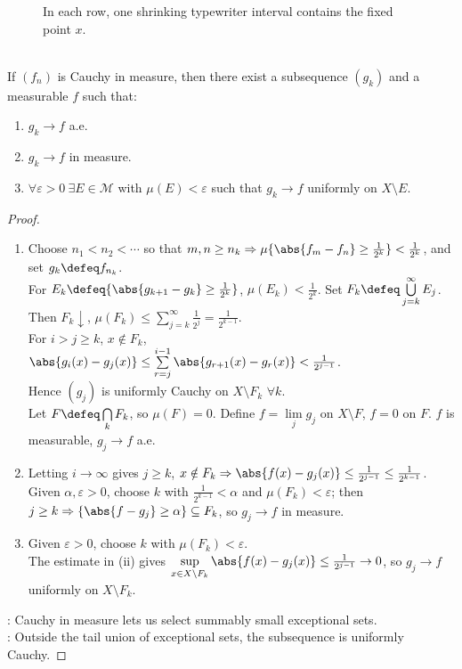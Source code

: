 \begin{figure}[H]
  \centering
  
  \caption{In each row, one shrinking typewriter interval contains the fixed point \textcolor{red!70!black}{$x$}.}
  \label{fig:typewriter-intervals-lp-no-pointwise}
\end{figure}

\begin{theorem} \label{thm:riesz-subsequence-cauchy-measure} \\
If $(f_n)$ is Cauchy in measure, then there exist a subsequence $(g_k)$ and a measurable $f$ such that:
\begin{enumerate}[label=(\roman*)]
\setlength{\itemsep}{0pt}
\item $g_k\to f$ a.e.
\item $g_k\to f$ in measure.
\item $\forall\varepsilon>0\ \exists E\in\mathcal{M}$ with $\mu(E)<\varepsilon$ such that $g_k\to f$ uniformly on $X\setminus E$.
\end{enumerate}
\begin{proof}
\begin{enumerate}[label=(\roman*)]
\setlength{\itemsep}{0pt}
\item Choose $n_1<n_2<\cdots$ so that $m,n\geq n_k\Rightarrow\mu\{\abs{f_m-f_n}\geq\frac{1}{2^k}\}<\frac{1}{2^k}$, and set $g_k\defeq f_{n_k}$.\\
For $E_k\defeq\{\abs{g_{k+1}-g_k}\geq\frac{1}{2^k}\}$, $\mu(E_k)<\frac{1}{2^k}$. Set $F_k\defeq\bigcup\limits_{j=k}^{\infty}E_j$. Then $F_k\downarrow$, $\mu(F_k)\leq\sum\limits_{j=k}^{\infty}\frac{1}{2^j}=\frac{1}{2^{k-1}}$.\\
For $i>j\geq k$, $x\notin F_k$, $\abs{g_i(x)-g_j(x)}\leq\sum\limits_{r=j}^{i-1}\abs{g_{r+1}(x)-g_r(x)}<\frac{1}{2^{j-1}}$.\\
Hence $(g_j)$ is uniformly Cauchy on $X\setminus F_k$ $\forall k$.\\
Let $F\defeq\bigcap\limits_kF_k$, so $\mu(F)=0$. Define $f=\lim\limits_jg_j$ on $X\setminus F$, $f=0$ on $F$. $f$ is measurable, $g_j\to f$ a.e.
\item Letting $i\to\infty$ gives $j\geq k$, $x\notin F_k\Rightarrow \abs{f(x)-g_j(x)}\leq\frac{1}{2^{j-1}}\leq\frac{1}{2^{k-1}}$. Given $\alpha,\varepsilon>0$, choose $k$ with $\frac{1}{2^{k-1}}<\alpha$ and $\mu(F_k)<\varepsilon$; then $j\geq k\Rightarrow \{\abs{f-g_j}\geq\alpha\}\subseteq F_k$, so $g_j\to f$ in measure.
\item Given $\varepsilon>0$, choose $k$ with $\mu(F_k)<\varepsilon$.\\
The estimate in (ii) gives $\sup\limits_{x\in X\setminus F_k}\abs{f(x)-g_j(x)}\leq\frac{1}{2^{j-1}}\to0$, so $g_j\to f$ uniformly on $X\setminus F_k$.
\end{enumerate}
: Cauchy in measure lets us select summably small exceptional sets.\\
: Outside the tail union of exceptional sets, the subsequence is uniformly Cauchy.
\end{proof}
\end{theorem}

